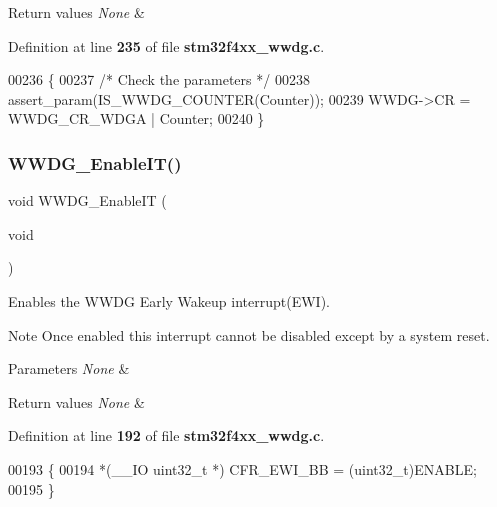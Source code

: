 \begin{DoxyRetVals}{Return values}
{\em None} & \\
\hline
\end{DoxyRetVals}


Definition at line \textbf{ 235} of file \textbf{ stm32f4xx\+\_\+wwdg.\+c}.


\begin{DoxyCode}
00236 \{
00237   \textcolor{comment}{/* Check the parameters */}
00238   assert_param(IS_WWDG_COUNTER(Counter));
00239   WWDG->CR = WWDG_CR_WDGA | Counter;
00240 \}
\end{DoxyCode}
\mbox{\label{group__WWDG_gac8af66ea5254d3d78b60b9b7c7f29521}} 
\subsubsection{W\+W\+D\+G\+\_\+\+Enable\+I\+T()}
{\footnotesize\ttfamily void W\+W\+D\+G\+\_\+\+Enable\+IT (\begin{DoxyParamCaption}\item[{void}]{ }\end{DoxyParamCaption})}



Enables the W\+W\+DG Early Wakeup interrupt(\+E\+W\+I). 

\begin{DoxyNote}{Note}
Once enabled this interrupt cannot be disabled except by a system reset. 
\end{DoxyNote}

\begin{DoxyParams}{Parameters}
{\em None} & \\
\hline
\end{DoxyParams}

\begin{DoxyRetVals}{Return values}
{\em None} & \\
\hline
\end{DoxyRetVals}


Definition at line \textbf{ 192} of file \textbf{ stm32f4xx\+\_\+wwdg.\+c}.


\begin{DoxyCode}
00193 \{
00194   *(\_\_IO uint32\_t *) CFR_EWI_BB = (uint32\_t)ENABLE;
00195 \}
\end{DoxyCode}
\mbox{\label{group__WWDG_ga7df4882d45918b9b8249dfca1e44fabc}} 
